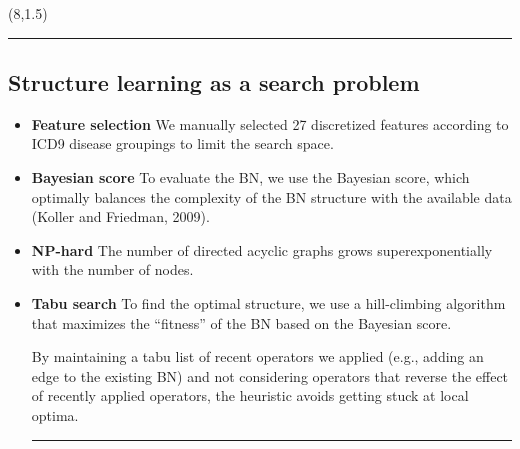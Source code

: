 \documentclass[a0]{a0poster}
\renewenvironment{leftbar}[1][\hsize]
{%
\def\FrameCommand 
{%

    {\color{black}\vrule width 0pt}%
    \hspace{0pt}%
    \fboxsep=\FrameSep\colorbox{white}%
}%
\MakeFramed{\hsize#1\advance\hsize-\width\FrameRestore}%
}
{\endMakeFramed}
\def\Head#1{\noindent{\LARGE\color{bluegray} #1}\bigskip}
\begin{document}
\begin{textblock}{7.0}
\begin{itemize}
\end{itemize}

\end{textblock}

\begin{textblock}{7.0}(8,1.5)

\hrule\medskip
\Head{Structure Learning}

\subsection{Structure learning as a search problem}

\begin{itemize}
  
  \item \textbf{Feature selection} We manually selected 27 discretized features according to ICD9 disease groupings to limit the search space.

  \item \textbf{Bayesian score} To evaluate the BN, we use the Bayesian score, which optimally balances the complexity of the BN structure with the available data (Koller and Friedman, 2009).

  \item \textbf{NP-hard} The number of directed acyclic graphs grows superexponentially with the number of nodes.

  \item \textbf{Tabu search} To find the optimal structure, we use a hill-climbing algorithm that maximizes the ``fitness'' of the BN based on the Bayesian score.

  By maintaining a tabu list of recent operators we applied (e.g., adding an edge to the existing BN) and not considering operators that reverse the effect of recently applied operators, the heuristic avoids getting stuck at local optima.

  \medskip \hrule
  \medskip


\end{itemize}
\end{textblock}
\end{document}
